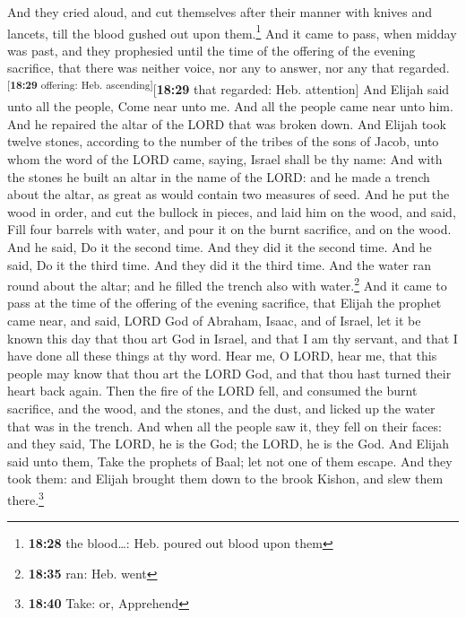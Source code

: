  And they cried aloud, and cut themselves after their
manner with knives and lancets, till the blood gushed out upon
them.\footnote{\textbf{18:28} the blood\ldots: Heb. poured out blood
  upon them}  And it came to pass, when midday was past,
and they prophesied until the time of the offering of the evening
sacrifice, that there was neither voice, nor any to answer, nor any that
regarded.\textsuperscript{{[}\textbf{18:29} offering: Heb.
ascending{]}}{[}\textbf{18:29} that regarded: Heb. attention{]}
 And Elijah said unto all the people, Come near unto me.
And all the people came near unto him. And he repaired the altar of the
LORD that was broken down.  And Elijah took twelve
stones, according to the number of the tribes of the sons of Jacob, unto
whom the word of the LORD came, saying, Israel shall be thy name:
 And with the stones he built an altar in the name of the
LORD: and he made a trench about the altar, as great as would contain
two measures of seed.  And he put the wood in order, and
cut the bullock in pieces, and laid him on the wood, and said, Fill four
barrels with water, and pour it on the burnt sacrifice, and on the wood.
 And he said, Do it the second time. And they did it the
second time. And he said, Do it the third time. And they did it the
third time.  And the water ran round about the altar; and
he filled the trench also with water.\footnote{\textbf{18:35} ran: Heb.
  went}  And it came to pass at the time of the offering
of the evening sacrifice, that Elijah the prophet came near, and said,
LORD God of Abraham, Isaac, and of Israel, let it be known this day that
thou art God in Israel, and that I am thy servant, and that I have done
all these things at thy word.  Hear me, O LORD, hear me,
that this people may know that thou art the LORD God, and that thou hast
turned their heart back again.  Then the fire of the LORD
fell, and consumed the burnt sacrifice, and the wood, and the stones,
and the dust, and licked up the water that was in the trench.
 And when all the people saw it, they fell on their
faces: and they said, The LORD, he is the God; the LORD, he is the God.
 And Elijah said unto them, Take the prophets of Baal;
let not one of them escape. And they took them: and Elijah brought them
down to the brook Kishon, and slew them there.\footnote{\textbf{18:40}
  Take: or, Apprehend}


